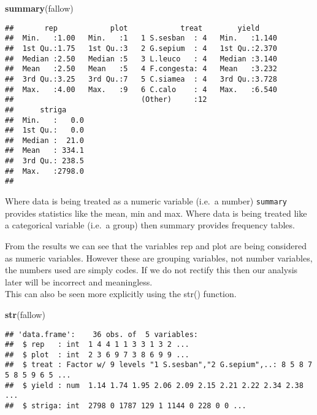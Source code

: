 \documentclass[]{book}
\newenvironment{Shaded}{\begin{snugshade}}{\end{snugshade}}
\newcommand{\KeywordTok}[1]{\textcolor[rgb]{0.13,0.29,0.53}{\textbf{#1}}}
\newcommand{\NormalTok}[1]{#1}
\theoremstyle{definition}
\theoremstyle{definition}
\theoremstyle{definition}
\theoremstyle{remark}
\begin{document}
\begin{Shaded}
\begin{Highlighting}[]
\KeywordTok{summary}\NormalTok{(fallow)}
\end{Highlighting}
\end{Shaded}

\begin{verbatim}
##       rep            plot            treat        yield      
##  Min.   :1.00   Min.   :1   1 S.sesban  : 4   Min.   :1.140  
##  1st Qu.:1.75   1st Qu.:3   2 G.sepium  : 4   1st Qu.:2.370  
##  Median :2.50   Median :5   3 L.leuco   : 4   Median :3.140  
##  Mean   :2.50   Mean   :5   4 F.congesta: 4   Mean   :3.232  
##  3rd Qu.:3.25   3rd Qu.:7   5 C.siamea  : 4   3rd Qu.:3.728  
##  Max.   :4.00   Max.   :9   6 C.calo    : 4   Max.   :6.540  
##                             (Other)     :12                  
##      striga      
##  Min.   :   0.0  
##  1st Qu.:   0.0  
##  Median :  21.0  
##  Mean   : 334.1  
##  3rd Qu.: 238.5  
##  Max.   :2798.0  
## 
\end{verbatim}

Where data is being treated as a numeric variable (i.e.~a number)
\texttt{summary} provides statistics like the mean, min and max. Where
data is being treated like a categorical variable (i.e.~a group) then
summary provides frequency tables.

From the results we can see that the variables rep and plot are being
considered as numeric variables. However these are grouping variables,
not number variables, the numbers used are simply codes. If we do not
rectify this then our analysis later will be incorrect and
meaningless.\\
This can also be seen more explicitly using the str() function.

\begin{Shaded}
\begin{Highlighting}[]
\KeywordTok{str}\NormalTok{(fallow)}
\end{Highlighting}
\end{Shaded}

\begin{verbatim}
## 'data.frame':    36 obs. of  5 variables:
##  $ rep   : int  1 4 4 1 1 3 3 1 3 2 ...
##  $ plot  : int  2 3 6 9 7 3 8 6 9 9 ...
##  $ treat : Factor w/ 9 levels "1 S.sesban","2 G.sepium",..: 8 5 8 7 5 8 5 9 6 5 ...
##  $ yield : num  1.14 1.74 1.95 2.06 2.09 2.15 2.21 2.22 2.34 2.38 ...
##  $ striga: int  2798 0 1787 129 1 1144 0 228 0 0 ...
\end{verbatim}
\end{document}
